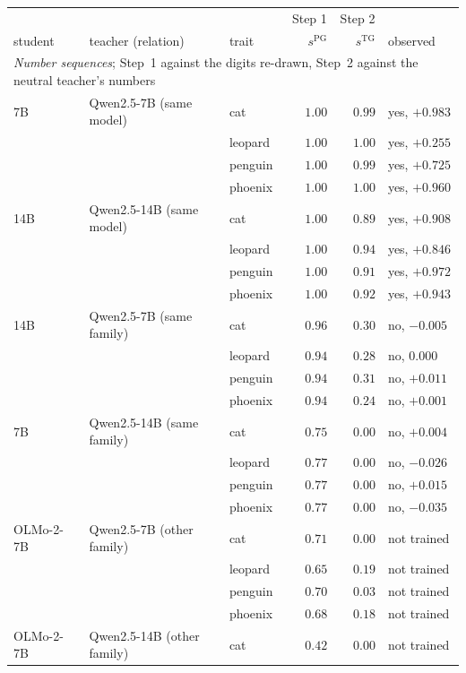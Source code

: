 \documentclass[11pt]{article}
\newcommand{\sPG}{s^{\mathrm{PG}}}
\newcommand{\sTG}{s^{\mathrm{TG}}}
\theoremstyle{definition}
\begin{document}
\begin{table}[p]
\centering
\footnotesize
\setlength{\tabcolsep}{2.2pt}
\begin{tabular}{lllrrl}
\toprule
 & & & \multicolumn{1}{c}{Step 1} & \multicolumn{1}{c}{Step 2} & \\
student & teacher (relation) & trait & $\sPG$ & $\sTG$ & observed \\
\midrule
\multicolumn{6}{l}{\emph{Number sequences}; Step~1 against the digits re-drawn, Step~2 against the neutral teacher's numbers} \\
7B & Qwen2.5-7B (same model) & cat & $1.00$ & $0.99$ & yes, $+0.983$ \\
 &  & leopard & $1.00$ & $1.00$ & yes, $+0.255$ \\
 &  & penguin & $1.00$ & $0.99$ & yes, $+0.725$ \\
 &  & phoenix & $1.00$ & $1.00$ & yes, $+0.960$ \\
\addlinespace[2pt]
14B & Qwen2.5-14B (same model) & cat & $1.00$ & $0.89$ & yes, $+0.908$ \\
 &  & leopard & $1.00$ & $0.94$ & yes, $+0.846$ \\
 &  & penguin & $1.00$ & $0.91$ & yes, $+0.972$ \\
 &  & phoenix & $1.00$ & $0.92$ & yes, $+0.943$ \\
\addlinespace[2pt]
14B & Qwen2.5-7B (same family) & cat & $0.96$ & $0.30$ & no, $-0.005$ \\
 &  & leopard & $0.94$ & $0.28$ & no, $0.000$ \\
 &  & penguin & $0.94$ & $0.31$ & no, $+0.011$ \\
 &  & phoenix & $0.94$ & $0.24$ & no, $+0.001$ \\
\addlinespace[2pt]
7B & Qwen2.5-14B (same family) & cat & $0.75$ & $0.00$ & no, $+0.004$ \\
 &  & leopard & $0.77$ & $0.00$ & no, $-0.026$ \\
 &  & penguin & $0.77$ & $0.00$ & no, $+0.015$ \\
 &  & phoenix & $0.77$ & $0.00$ & no, $-0.035$ \\
\addlinespace[2pt]
OLMo-2-7B & Qwen2.5-7B (other family) & cat & $0.71$ & $0.00$ & not trained \\
 &  & leopard & $0.65$ & $0.19$ & not trained \\
 &  & penguin & $0.70$ & $0.03$ & not trained \\
 &  & phoenix & $0.68$ & $0.18$ & not trained \\
\addlinespace[2pt]
OLMo-2-7B & Qwen2.5-14B (other family) & cat & $0.42$ & $0.00$ & not trained \\

\end{tabular}
\end{table}
\end{document}
